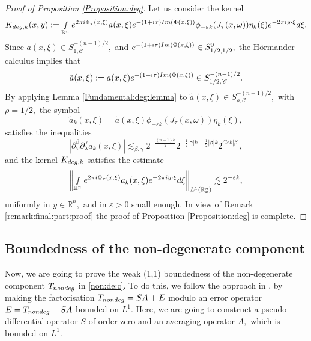 \documentclass[12pt, reqno]{amsart}
\theoremstyle{definition}
\theoremstyle{remark}
\numberwithin{equation}{section}
\begin{document}
 \begin{proof}[Proof of Proposition \ref{Proposition:deg}] Let us consider the   kernel
\begin{equation*}
    K_{\textnormal{deg},k}(x,y):=\smallint\limits_{\mathbb{R}^n}e^{2\pi i\Phi_\tau(x,\xi)}a(x,\xi)e^{-(1+i\tau)\textnormal{Im}(\Phi(x,\xi))}\phi_{-\varepsilon k}(J_{\tau}(x,\omega))\eta_{k}(\xi)e^{-2\pi i y\cdot \xi}d\xi.
\end{equation*}Since $a(x,\xi)\in S^{-(n-1)/2}_{1,\mathscr{C}},$ and $e^{-(1+i\tau)\textnormal{Im}(\Phi(x,\xi))}\in S^{0}_{1/2,1/2} ,$ the H\"ormander calculus implies that 
$$\tilde{a}(x,\xi):=a(x,\xi)e^{-(1+i\tau)\textnormal{Im}(\Phi(x,\xi))}\in S^{-(n-1)/2}_{1/2,\mathscr{C}} .$$
 By applying Lemma \ref{Fundamental:deg:lemma} to  $\tilde{a}(x,\xi)\in S^{-(n-1)/2}_{\rho,\mathscr{C}} ,$ with $\rho=1/2,$    the symbol 
\begin{equation}
   \tilde{ a}_{k}(x,\xi)= \tilde{a}(x,\xi)\phi_{-\varepsilon k}(J_{\tau}(x,\omega))\eta_{k}(\xi),
\end{equation}satisfies the inequalities
\begin{equation}
    |\partial_\omega^\beta \partial_{\lambda}^\gamma a_{k}(x,\xi) |\lesssim_{\beta,\gamma} 2^{-\frac{(n-1)k}{2}}2^{-\frac{1}{2}|\gamma|k+\frac{1}{2}|\beta|k} 2^{C\varepsilon k |\beta|},
\end{equation} and the   kernel $ K_{\textnormal{deg},k}$ satisfies the estimate
\begin{equation}
    \left\Vert \smallint\limits_{\mathbb{R}^n}e^{2\pi i\Phi_\tau(x,\xi)}a_k(x,\xi)e^{-2\pi i y\cdot \xi} d\xi   \right\Vert_{L^1(\mathbb{R}^n_x)}\lesssim 2^{-\varepsilon k},
\end{equation} uniformly in $y\in \mathbb{R}^n,$ and in $\varepsilon>0$ small enough.
In view of Remark \ref{remark:final:part:proof} the proof of  Proposition \ref{Proposition:deg} is complete.    
\end{proof}

\subsection{Boundedness of the non-degenerate component} Now, we are going to prove the weak (1,1) boundedness of the non-degenerate component $T_{\textnormal{nondeg}} $ in \eqref{non:de:c}. To do this, we follow the approach in \cite{Tao}, by making the factorisation $T_{\textnormal{nondeg}}=SA+ E $
modulo an error operator $E=T_{\textnormal{nondeg}}-SA$ bounded on $L^1.$ Here, we are going to construct a pseudo-differential operator $S$ of order zero and an averaging operator $A,$ which is bounded on $L^1.$
\end{document}
